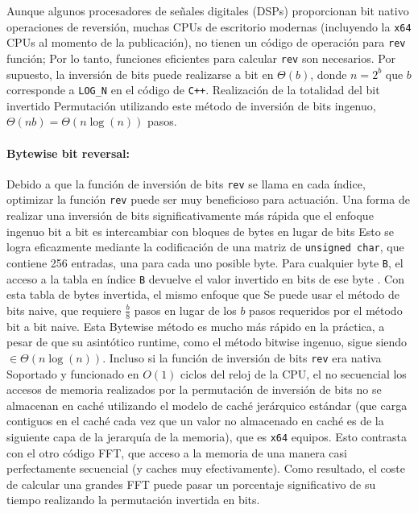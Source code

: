 ﻿\documentclass[10pt]{article}
\begin{document}
Aunque algunos procesadores de señales digitales (DSPs) proporcionan bit nativo operaciones de reversión, muchas CPUs de escritorio modernas (incluyendo la {\tt x64} CPUs al momento de la publicación), no tienen un código de operación para
{\tt rev} función; Por lo tanto, funciones eficientes para calcular {\tt rev} son necesarios. Por supuesto, la inversión de bits puede realizarse a bit en $\Theta(b)$, donde $n=2^b$ que $b$ corresponde a {\tt LOG\_N} en el código de {\tt C++}. Realización de la totalidad del bit invertido
Permutación utilizando este método de inversión de bits ingenuo,
$\Theta(n b) = \Theta(n \log(n))$ pasos.
\paragraph{Bytewise bit reversal:}
Debido a que la función de inversión de bits {\tt rev} se llama en cada índice, optimizar la función {\tt rev} puede ser muy beneficioso para
actuación. Una forma de realizar una inversión de bits significativamente más rápida que el enfoque ingenuo bit a bit es intercambiar con bloques de bytes en lugar de bits Esto se logra eficazmente mediante la codificación de una matriz de {\tt unsigned char}, que contiene 256 entradas, una para cada uno posible byte. Para cualquier byte {\tt B}, el acceso a la tabla en índice
{\tt B} devuelve el valor invertido en bits de ese byte \cite{j: best, anderson: bit}. Con esta tabla de bytes invertida, el mismo enfoque que
Se puede usar el método de bits naive, que requiere $\frac{b}{8}$ pasos en lugar de los $ b $ pasos requeridos por el método bit a bit naive. Esta
Bytewise método es mucho más rápido en la práctica, a pesar de que su asintótico runtime, como el método bitwise ingenuo, sigue siendo $\in \Theta(n \log(n))$.
Incluso si la función de inversión de bits {\tt rev} era nativa
Soportado y funcionado en $ O (1) $ ciclos del reloj de la CPU, el no secuencial los accesos de memoria realizados por la permutación de inversión de bits no se almacenan en caché utilizando el modelo de caché jerárquico estándar (que carga contiguos en el caché cada vez que un valor no almacenado en caché es de la siguiente capa de la jerarquía de la memoria), que es {\tt x64} equipos. Esto contrasta con el otro código FFT, que acceso a la memoria de una manera casi perfectamente secuencial (y caches muy efectivamente). Como resultado, el coste de calcular una grandes FFT puede pasar un porcentaje significativo de su tiempo realizando la permutación invertida en bits.
\end{document}
